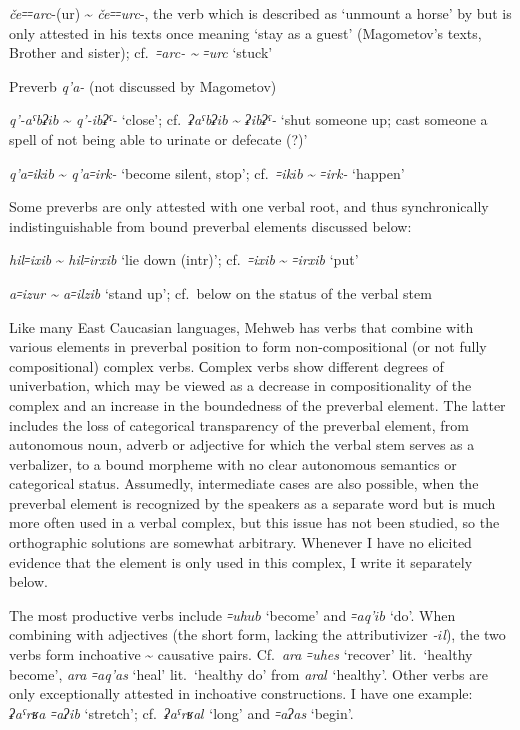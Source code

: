 \documentclass[output=paper]{langsci/langscibook}
\begin{document}
\ex %
\emph{če꞊꞊arc}-(ur) \textasciitilde{} \emph{če꞊꞊urc}-, the verb
which is described as `unmount a horse' by \citet[76]{magometov1982} but is
only attested in his texts once meaning `stay as a guest' (Magometov's
texts, Brother and sister); cf.\ \emph{꞊arc- \textasciitilde{} ꞊urc}
`stuck'
\z

\ex %
Preverb \emph{q'a-} (not discussed by Magometov)

\ea %
\emph{q'-aˤbʡ\(ib\)} \textasciitilde{} \emph{q'-ibʡˤ-} `close'; cf.\
\emph{ʡaˤbʡ\(ib\)} \textasciitilde{} \emph{ʡibʡˤ-} `shut someone up; cast
someone a spell of not being able to urinate or defecate (?)'

\ex %
\emph{q'a꞊ik\(ib\)} \textasciitilde{} \emph{q'a꞊irk-} `become silent,
stop'; cf.\ \emph{꞊ik\(ib\)} \textasciitilde{} \emph{꞊irk-} `happen'
\z
\z

Some preverbs are only attested with one verbal root, and thus
synchronically indistinguishable from bound preverbal elements discussed
below:

\ea %
\emph{hil꞊ixib} \textasciitilde{} \emph{hil꞊irxib} `lie down
(intr)'; cf.\ \emph{꞊ixib} \textasciitilde{} \emph{꞊irxib} `put'

\ex %
\emph{a꞊izur \textasciitilde{} a꞊ilzib} `stand up'; cf.\ below on
the status of the verbal stem
\z

Like many East Caucasian languages, Mehweb has verbs that combine with
various elements in preverbal position to form non-compositional (or not
fully compositional) complex verbs. Сomplex verbs show different degrees
of univerbation, which may be viewed as a decrease in compositionality of
the complex and an increase in the boundedness of the preverbal element.
The latter includes the loss of categorical transparency of the
preverbal element, from autonomous noun, adverb or adjective for which
the verbal stem serves as a verbalizer, to a bound morpheme with no
clear autonomous semantics or categorical status. Assumedly,
intermediate cases are also possible, when the preverbal element is
recognized by the speakers as a separate word but is much more often
used in a verbal complex, but this issue has not been studied, so the
orthographic solutions are somewhat arbitrary. Whenever I have no
elicited evidence that the element is only used in this complex, I write
it separately below.

The most productive verbs include \emph{꞊uh\(ub\)} `become' and
\emph{꞊aq'\(ib\)} `do'. When combining with adjectives (the short form,
lacking the attributivizer \emph{-\(i\)l}), the two verbs form
inchoative \textasciitilde{} causative
pairs. Cf.\ \emph{ara ꞊uhes}
`recover' lit.\ `healthy become', \emph{ara ꞊aq'as} `heal' lit.\ `healthy
do' from \emph{ara\(l\)} `healthy'. Other verbs are only exceptionally
attested in inchoative constructions. I have one example: \emph{ʡaˤrʁa
꞊aʔib} `stretch'; cf.\ \emph{ʡaˤrʁa\(l\)} `long' and \emph{꞊aʔas} `begin'.
\end{document}

